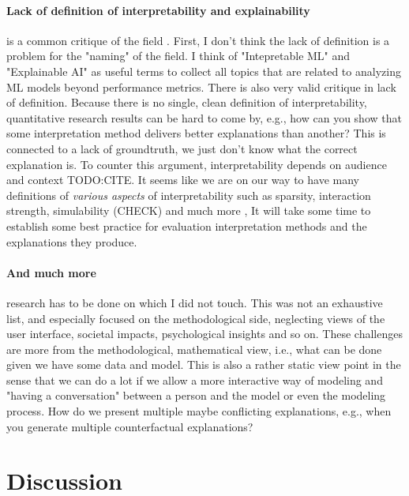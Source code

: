 \documentclass[runningheads]{llncs}
\begin{document}
\paragraph{Lack of definition of interpretability and explainability} is a common critique of the field \cite{lipton2018mythos}.
First, I don't think the lack of definition is a problem for the "naming" of the field.
I think of "Intepretable ML" and "Explainable AI" as useful terms to collect all topics that are related to analyzing ML models beyond performance metrics.
There is also very valid critique in lack of definition.
Because there is no single, clean definition of interpretability, quantitative research results can be hard to come by, e.g., how can you show that some interpretation method delivers better explanations than another?
This is connected to a lack of groundtruth, we just don't know what the correct explanation is.
To counter this argument, interpretability depends on audience and context TODO:CITE.
It seems like we are on our way to have many definitions of \textit{various aspects} of interpretability such as sparsity, interaction strength, simulability (CHECK) and much more \cite{poursabzi2018manipulating,philipp2018measuring,molnar2019quantifying,hauenstein2018computing,zhou2018measuring,akaike1998information,schwarz1978estimating,poursabzi2018manipulating,dhurandhar2017tip,friedler2019assessing},
It will take some time to establish some best practice for evaluation interpretation methods and the explanations they produce.

\paragraph{And much more} research has to be done on which I did not touch.
This was not an exhaustive list, and especially focused on the methodological side, neglecting views of the user interface, societal impacts, psychological insights and so on.
These challenges are more from the methodological, mathematical view, i.e., what can be done given we have some data and model.
This is also a rather static view point in the sense that we can do a lot if we allow a more interactive way of modeling and "having a conversation" between a person and the model or even the modeling process.
How do we present multiple maybe conflicting explanations, e.g., when you generate multiple counterfactual explanations?

\section{Discussion}
\end{document}
